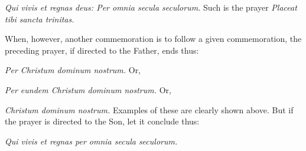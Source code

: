 \documentclass[openany]{book}
\renewcommand{\\}{\par\hspace*{.25em}} %
\renewcommand{\newline}{\par}
\begin{document}
\newline \emph{Qui vivis et regnas deus: Per omnia secula seculorum.} Such is the prayer \emph{Placeat tibi sancta trinitas.}
\newline When, however, another commemoration is to follow a given commemoration, the preceding prayer, if directed to the Father, ends thus:
\newline \emph{Per Christum dominum nostrum.} Or,
\newline \emph{Per eundem Christum dominum nostrum.} Or,
\newline \emph{Christum dominum nostrum.} Examples of these are clearly shown above. But if the prayer is directed to the Son, let it conclude thus:
\newline \emph{Qui vivis et regnas per omnia secula seculorum.}
\end{document}
